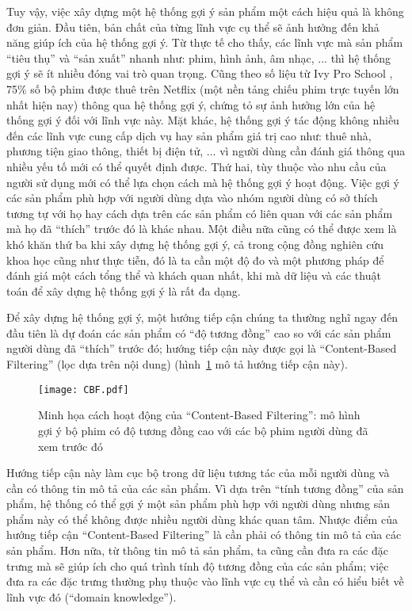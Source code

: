 Tuy vậy, việc xây dựng một hệ thống gợi ý sản phẩm một cách hiệu quả là không đơn giản.
Đầu tiên, bản chất của từng lĩnh vực cụ thể sẽ ảnh hưởng đến khả năng giúp ích của hệ thống gợi ý.
Từ thực tế cho thấy, các lĩnh vực mà sản phẩm ``tiêu thụ'' và ``sản xuất'' nhanh như: phim, hình ảnh, âm nhạc, ... 
thì hệ thống gợi ý sẽ ít nhiều đóng vai trò quan trọng. 
Cũng theo số liệu từ Ivy Pro School \cite{ivy}, 75\% số bộ phim được thuê trên Netflix (một nền tảng chiếu phim trực tuyến lớn nhất hiện nay) thông qua hệ thống gợi ý, chứng tỏ sự ảnh hưởng lớn của hệ thống gợi ý đối với lĩnh vực này. 
Mặt khác, hệ thống gợi ý tác động không nhiều đến các lĩnh vực cung cấp dịch vụ hay sản phẩm giá trị cao như:
thuê nhà, phương tiện giao thông, thiết bị điện tử, ... vì người dùng cần đánh giá thông qua nhiều yếu tố mới có thể quyết định được. 
Thứ hai, tùy thuộc vào nhu cầu của người sử dụng mới có thể lựa chọn cách mà hệ thống gợi ý hoạt động.
Việc gợi ý các sản phẩm phù hợp với người dùng dựa vào nhóm người dùng có sở thích tương tự với họ 
hay cách dựa trên các sản phẩm có liên quan với các sản phẩm mà họ đã ``thích'' trước đó là khác nhau.
Một điều nữa cũng có thể được xem là khó khăn thứ ba khi xây dựng hệ thống gợi ý, cả trong cộng đồng nghiên cứu khoa học cũng như thực tiễn, 
đó là ta cần một độ đo và một phương pháp để đánh giá một cách tổng thể và khách quan nhất, 
khi mà dữ liệu và các thuật toán để xây dựng hệ thống gợi ý là rất đa dạng.

Để xây dựng hệ thống gợi ý, một hướng tiếp cận chúng ta thường nghĩ ngay đến đầu tiên
là dự đoán các sản phẩm có ``độ tương đồng'' cao so với các sản phẩm người dùng đã ``thích'' trước đó;
hướng tiếp cận này được gọi là ``Content-Based Filtering'' (lọc dựa trên nội dung) (hình~\ref{fig_CBF} mô tả hướng tiếp cận này).
\begin{figure}
    \centering
	\texttt{[image: CBF.pdf]}
    \caption[Minh họa cách hoạt động của ``Content-Based Filtering'']{Minh họa cách hoạt động của ``Content-Based Filtering'':
    mô hình gợi ý bộ phim có độ tương đồng cao với các bộ phim
    người dùng đã xem trước đó}
    \label{fig_CBF}
\end{figure}
Hướng tiếp cận này làm cục bộ trong dữ liệu tương tác của mỗi người dùng và cần có thông tin mô tả của các sản phẩm.
Vì dựa trên ``tính tương đồng'' của sản phẩm, hệ thống có thể gợi ý một sản phẩm phù hợp với người dùng nhưng sản phẩm này có thể không được nhiều người dùng khác quan tâm.
Nhược điểm của hướng tiếp cận ``Content-Based Filtering'' là cần phải có thông tin mô tả của các sản phẩm. Hơn nữa, từ thông tin mô tả sản phẩm, ta cũng cần đưa ra các đặc trưng mà sẽ giúp ích cho quá trình tính độ tương đồng của các sản phẩm; việc đưa ra các đặc trưng thường phụ thuộc vào lĩnh vực cụ thể và cần có hiểu biết về lĩnh vực đó (``domain knowledge'').

